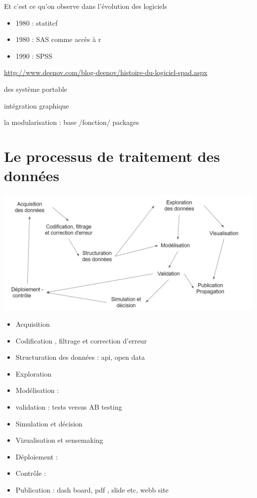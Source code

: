 \documentclass[
]{book}
\providecommand{\tightlist}{%
  \setlength{\itemsep}{0pt}\setlength{\parskip}{0pt}}
\begin{document}
Et c'est ce qu'on observe dans l'évolution des logiciels

\begin{itemize}
\tightlist
\item
  1980 : statitcf
\item
  1980 : SAS comme accès à r
\item
  1990 : SPSS
\end{itemize}

\url{http://www.deenov.com/blog-deenov/histoire-du-logiciel-spad.aspx}

des système portable

intégration graphique

la modularisation : base /fonction/ packages

\hypertarget{le-processus-de-traitement-des-donnuxe9es}{%
\section{Le processus de traitement des données}\label{le-processus-de-traitement-des-donnuxe9es}}

\includegraphics{./Images/datascience2.png}

\begin{itemize}
\tightlist
\item
  Acquisition
\item
  Codification , filtrage et correction d'erreur
\item
  Structuration des données : api, open data
\item
  Exploration
\item
  Modélisation :
\item
  validation : tests versus AB testing
\item
  Simulation et décision
\item
  Vizualisation et sensemaking
\item
  Déploiement :
\item
  Contrôle :
\item
  Publication : dash board, pdf , slide etc, webb site
\end{itemize}
\end{document}
